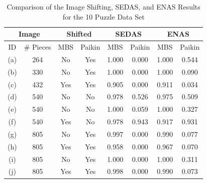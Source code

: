 \begin{table}[tb]
\begin{center}
\caption{Comparison of the Image Shifting, SEDAS, and ENAS Results for the 10 Puzzle Data Set}\label{tab:pomeranzBestBuddiesVisualizations}
\begin{tabular}{ c|c||c|c||c|c||c|c } 
 \toprule
 \multicolumn{2}{c||}{Image} & \multicolumn{2}{c||}{Shifted} & \multicolumn{2}{c||}{SEDAS} & \multicolumn{2}{c}{ENAS} \\
\hline
 ID  & \# Pieces & MBS & Paikin & MBS & Paikin & MBS & Paikin  \\ 
\hline \hline
 (a) &  264     & No  & Yes & 1.000  & 0.000 & 1.000 & 0.544 \\ 
\hline
 (b) &  330     & No  & Yes & 1.000  & 0.000 & 1.000 &  0.090 \\ 
\hline
 (c) &  432     & Yes & Yes & 0.905 &  0.000 & 0.911 & 0.034 \\  
\hline
 (d) &  540     & No  & No  & 0.978 & 0.526 & 0.975 & 0.509 \\ 
\hline
 (e) &  540     & No  & No  & 1.000  &  0.059 & 1.000  & 0.327 \\ 
\hline
 (f) &  540     & Yes & No  & 0.978 & 0.943 & 0.917 & 0.931 \\ 
\hline
 (g) &  805     & No  & Yes & 0.997 &  0.000 & 0.990 &  0.077 \\ 
\hline
 (h) &  805     & Yes & Yes & 0.958 &  0.000   & 0.967 &  0.070 \\ 
\hline
 (i) &  805     & No  & Yes & 1.000  &  0.000   & 1.000  &  0.311 \\ 
\hline
 (j) &  805     & Yes & Yes & 0.998 &  0.000   & 0.990 &   0.073 \\ 
 \bottomrule
\end{tabular}
\end{center}
\end{table}